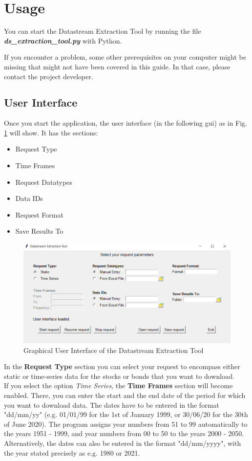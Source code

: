 \section{Usage}
You can start the Datastream Extraction Tool by running the file \textbf{\textit{ds\_extraction\_tool.py}} with Python. 

If you encounter a problem, some other prerequisites on your computer might be missing that might not have been covered in this guide. In that case, please contact the project developer. 

\subsection{User Interface}
Once you start the application, the user interface (in the following gui) as in Fig. \ref{fig:gui-2} will show. It has the sections: 
\begin{itemize}
	\item Request Type
	\item Time Frames
	\item Request Datatypes
	\item Data IDs
	\item Request Format
	\item Save Results To
\end{itemize}

\begin{figure}[h]
	\centering
	\includegraphics[width=1.1\linewidth]{figures/gui.png}
	\caption{Graphical User Interface of the Datastream Extraction Tool}
	\label{fig:gui-2}
\end{figure}

In the \textbf{Request Type} section you can select your request to encompass either static or time-series data for the stocks or bonds that you want to download. \\

If you select the option \textit{Time Series}, the \textbf{Time Frames} section will become enabled. There, you can enter the start and the end date of the period for which you want to download data. The dates have to be entered in the format "dd/mm/yy" (e.g. 01/01/99 for the 1st of January 1999, or 30/06/20 for the 30th of June 2020). The program assigns year numbers from 51 to 99 automatically to the years 1951 - 1999, and year numbers from 00 to 50 to the years 2000 - 2050. Alternatively, the dates can also be entered in the format "dd/mm/yyyy", with the year stated precisely as e.g. 1980 or 2021.

